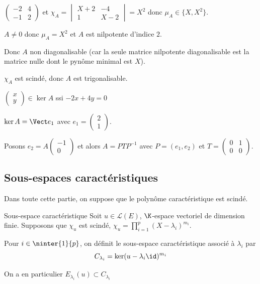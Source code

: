 \begin{exemple}
    $\begin{pmatrix}
        -2 & 4 \\ 
        -1 & 2
    \end{pmatrix}$ et $\chi_A = \begin{vmatrix}
        X + 2 & -4 \\
        1 & X - 2
    \end{vmatrix} = X^2$ donc $\mu_A \in \{X, X^2\}$.

    $A \neq 0$ donc $\mu_A = X^2$ et $A$ est nilpotente d'indice $2$.

    Donc $A$ non diagonalisable (car la seule matrice nilpotente diagonalisable 
    est la matrice nulle dont le pynôme minimal est $X$).

    $\chi_A$ est scindé, donc $A$ est trigonalisable. 

    $\begin{pmatrix}
        x \\ y
    \end{pmatrix} \in \ker A$ ssi $-2x + 4y = 0$

    $\ker A = \Vect e_1$ avec $e_1 = \begin{pmatrix}
        2 \\ 1
    \end{pmatrix}$.

    Posons $e_2 = A \begin{pmatrix}
        -1 \\ 0
    \end{pmatrix}$ et alors $A = PTP^{-1}$ avec $P = (e_1, e_2)$ et 
    $T = \begin{pmatrix}
        0 & 1 \\
        0 & 0
    \end{pmatrix}$.
\end{exemple}


\subsection{Sous-espaces caractéristiques}

Dans toute cette partie, on suppose que le polynôme caractéristique est scindé.

\begin{definition}{Sous-espace caractéristique}{}
    Soit $u \in \mathscr L(E)$, $\K$-espace vectoriel de dimension finie. Supposons
    que $\chi_u$ est scindé, $\displaystyle \chi_u = \prod_{i = 1 }^{ p } (X - \lambda_i)^{m_i}$.

    \lvspace \avspace 

    Pour $i \in \ninter{1}{p}$, on définit le sous-espace caractéristique associé à $\lambda_i$ par 
    $$C_{\lambda_i} = \ker (u - \lambda_i \id )^{m_i}$$

    On a en particulier $E_{\lambda_i}(u) \subset C_{\lambda_i} $
\end{definition}

